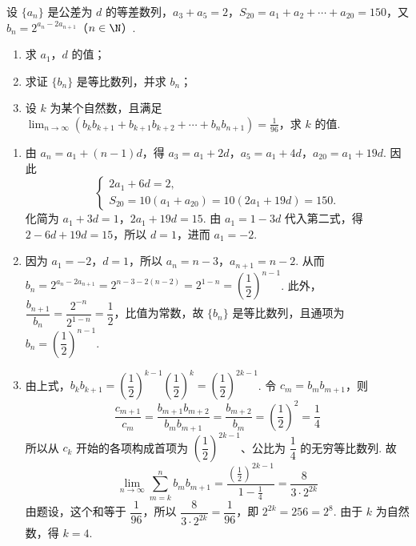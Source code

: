 \documentclass[UTF8,a4paper,oneside,11pt]{ctexbook}
\begin{document}
\begin{problem}
设 \(\{a_{n}\}\) 是公差为 \(d\) 的等差数列，\(a_{3} + a_{5} = 2\)，\(S_{20} = a_{1} + a_{2} + \cdots + a_{20} = 150\)，又 \(b_{n} = 2^{a_{n} - 2a_{n+1}}\)（\(n \in \N\)）.

\begin{enumerate}
\item 求 \(a_{1}\)，\(d\) 的值；
\item 求证 \(\{b_{n}\}\) 是等比数列，并求 \(b_{n}\)；
\item 设 \(k\) 为某个自然数，且满足 \(\displaystyle\lim_{n\to\infty}\left(b_k b_{k+1} + b_{k+1} b_{k+2} + \cdots + b_n b_{n+1}\right) = \frac{1}{96}\)，求 \(k\) 的值.
\end{enumerate}
\end{problem}

\begin{solution}
\begin{enumerate}
\item 由 \(a_n=a_1+(n-1)d\)，得 \(a_3=a_1+2d\)，\(a_5=a_1+4d\)，\(a_{20}=a_1+19d\). 因此
\[
\begin{cases}
2a_1+6d=2,\\
S_{20}=10(a_1+a_{20})=10(2a_1+19d)=150.
\end{cases}
\]
化简为 \(a_1+3d=1\)，\(2a_1+19d=15\). 由 \(a_1=1-3d\) 代入第二式，得 \(2-6d+19d=15\)，所以 \(d=1\)，进而 \(a_1=-2\).

\item 因为 \(a_1=-2\)，\(d=1\)，所以 \(a_n=n-3\)，\(a_{n+1}=n-2\). 从而
\(b_n=2^{a_n-2a_{n+1}}=2^{n-3-2(n-2)}=2^{1-n}=\left(\dfrac12\right)^{n-1}\). 此外，\(\dfrac{b_{n+1}}{b_n}=\dfrac{2^{-n}}{2^{1-n}}=\dfrac12\)，比值为常数，故 \(\{b_n\}\) 是等比数列，且通项为 \(b_n=\left(\dfrac12\right)^{n-1}\).

\item 由上式，\(b_kb_{k+1}=\left(\dfrac12\right)^{k-1}\left(\dfrac12\right)^k=\left(\dfrac12\right)^{2k-1}\). 令 \(c_m=b_mb_{m+1}\)，则
\[
\frac{c_{m+1}}{c_m}=\frac{b_{m+1}b_{m+2}}{b_mb_{m+1}}=\frac{b_{m+2}}{b_m}=\left(\frac12\right)^2=\frac14
\]
所以从 \(c_k\) 开始的各项构成首项为 \(\left(\dfrac12\right)^{2k-1}\)、公比为 \(\dfrac14\) 的无穷等比数列. 故
\[
\displaystyle\lim_{n\to\infty}\sum_{m=k}^n b_mb_{m+1}=\frac{\left(\frac12\right)^{2k-1}}{1-\frac14}=\frac{8}{3\cdot2^{2k}}
\]
由题设，这个和等于 \(\dfrac1{96}\)，所以 \(\dfrac{8}{3\cdot2^{2k}}=\dfrac1{96}\)，即 \(2^{2k}=256=2^8\). 由于 \(k\) 为自然数，得 \(k=4\).
\end{enumerate}
\end{solution}
\end{document}
